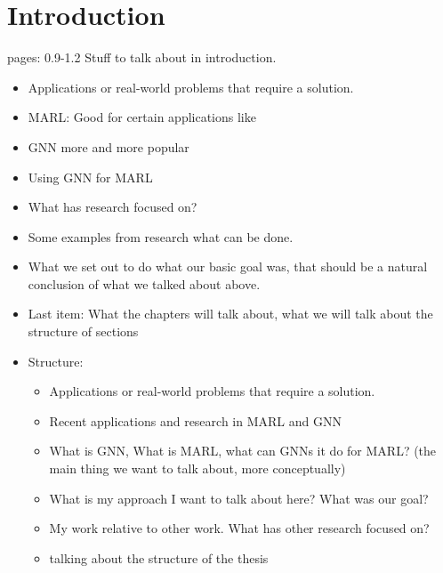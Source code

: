 
\chapter{Introduction}
pages: 0.9-1.2
Stuff to talk about in introduction.
\begin{itemize}[noitemsep,nolistsep]
	\item Applications or real-world problems that require a solution. 
	\item MARL: Good for certain applications like
	\item GNN more and more popular
	\item Using GNN for MARL
	\item What has research focused on?
	\item Some examples from research what can be done.
	\item What we set out to do what our basic goal was, that should be a natural conclusion of what we talked about above.
	\item Last item: What the chapters will talk about, what we will talk about the structure of sections
	\item Structure:
	\begin{itemize}[noitemsep,nolistsep]
		\item Applications or real-world problems that require a solution. 
		\item Recent applications and research in MARL and GNN
		\item What is GNN, What is MARL, what can GNNs it do for MARL? (the main thing we want to talk about, more conceptually)
		\item What is my approach I want to talk about here? What was our goal?
		\item My work relative to other work. What has other research focused on?
		\item talking about the structure of the thesis
	\end{itemize}
\end{itemize}